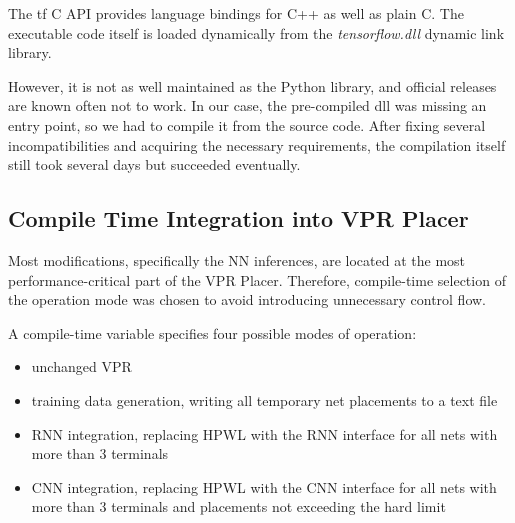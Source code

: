 The \gls{tf} C API provides language bindings for C++ as well as plain C. The executable code itself is loaded dynamically from the \textit{tensorflow.dll} dynamic link library.

However, it is not as well maintained as the Python library, and official releases are known often not to work. In our case, the pre-compiled \gls{dll} was missing an entry point, so we had to compile it from the source code. After fixing several incompatibilities and acquiring the necessary requirements, the compilation itself still took several days but succeeded eventually.

\subsection{Compile Time Integration into \gls{VPR} Placer}

Most modifications, specifically the \gls{NN} inferences, are located at the most performance-critical part of the \gls{VPR} Placer. Therefore, compile-time selection of the operation mode was chosen to avoid introducing unnecessary control flow. 

A compile-time variable specifies four possible modes of operation: 

\begin{itemize}
	\item unchanged \gls{VPR}
	\item training data generation, writing all temporary net placements to a text file
	\item \gls{RNN} integration, replacing \gls{HPWL} with the \gls{RNN} interface for all nets with more than 3 terminals
	\item \gls{CNN} integration, replacing \gls{HPWL} with the \gls{CNN} interface for all nets with more than 3 terminals and placements not exceeding the hard limit
\end{itemize}
